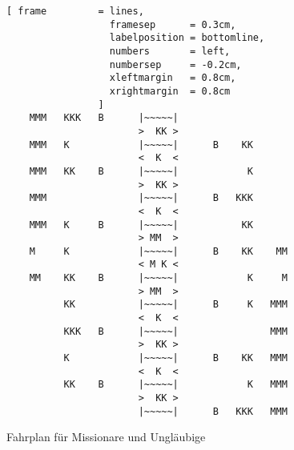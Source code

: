 \begin{figure}[!h]
  \centering
\begin{Verbatim}[ frame         = lines, 
                  framesep      = 0.3cm, 
                  labelposition = bottomline,
                  numbers       = left,
                  numbersep     = -0.2cm,
                  xleftmargin   = 0.8cm,
                  xrightmargin  = 0.8cm
                ]
    MMM   KKK   B      |~~~~~|                   
                       >  KK >
    MMM   K            |~~~~~|      B    KK      
                       <  K  <
    MMM   KK    B      |~~~~~|            K      
                       >  KK >
    MMM                |~~~~~|      B   KKK      
                       <  K  <
    MMM   K     B      |~~~~~|           KK      
                       > MM  >
    M     K            |~~~~~|      B    KK    MM
                       < M K <
    MM    KK    B      |~~~~~|            K     M
                       > MM  >
          KK           |~~~~~|      B     K   MMM
                       <  K  <
          KKK   B      |~~~~~|                MMM
                       >  KK >
          K            |~~~~~|      B    KK   MMM
                       <  K  <
          KK    B      |~~~~~|            K   MMM
                       >  KK >
                       |~~~~~|      B   KKK   MMM
\end{Verbatim}
\vspace*{-0.3cm}
  \caption{Fahrplan f\"{u}r Missionare und Ungl\"{a}ubige}
  \label{fig:missionare-solution}
\end{figure}      

